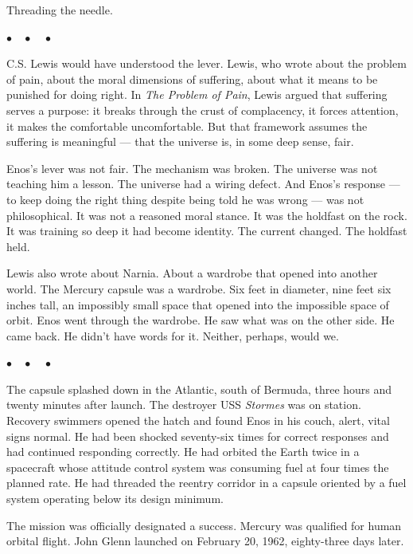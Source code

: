 \documentclass[12pt, letterpaper]{article}
\begin{document}
Threading the needle.

\begin{center}
$\bullet\quad\bullet\quad\bullet$
\end{center}

C.S. Lewis would have understood the lever. Lewis, who wrote about the problem of pain, about the moral dimensions of suffering, about what it means to be punished for doing right. In \emph{The Problem of Pain}, Lewis argued that suffering serves a purpose: it breaks through the crust of complacency, it forces attention, it makes the comfortable uncomfortable. But that framework assumes the suffering is meaningful --- that the universe is, in some deep sense, fair.

Enos's lever was not fair. The mechanism was broken. The universe was not teaching him a lesson. The universe had a wiring defect. And Enos's response --- to keep doing the right thing despite being told he was wrong --- was not philosophical. It was not a reasoned moral stance. It was the holdfast on the rock. It was training so deep it had become identity. The current changed. The holdfast held.

Lewis also wrote about Narnia. About a wardrobe that opened into another world. The Mercury capsule was a wardrobe. Six feet in diameter, nine feet six inches tall, an impossibly small space that opened into the impossible space of orbit. Enos went through the wardrobe. He saw what was on the other side. He came back. He didn't have words for it. Neither, perhaps, would we.

\begin{center}
$\bullet\quad\bullet\quad\bullet$
\end{center}

The capsule splashed down in the Atlantic, south of Bermuda, three hours and twenty minutes after launch. The destroyer USS \emph{Stormes} was on station. Recovery swimmers opened the hatch and found Enos in his couch, alert, vital signs normal. He had been shocked seventy-six times for correct responses and had continued responding correctly. He had orbited the Earth twice in a spacecraft whose attitude control system was consuming fuel at four times the planned rate. He had threaded the reentry corridor in a capsule oriented by a fuel system operating below its design minimum.

The mission was officially designated a success. Mercury was qualified for human orbital flight. John Glenn launched on February 20, 1962, eighty-three days later.
\end{document}
